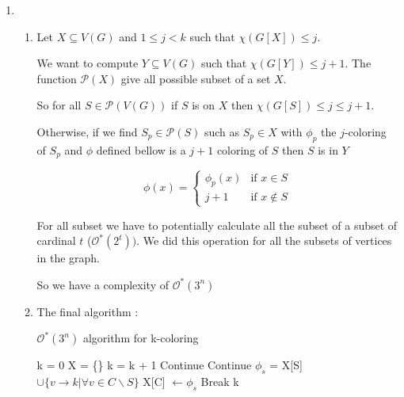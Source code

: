 \documentclass{article}
\theoremstyle{plain}
\begin{document}
\begin{enumerate}
    \newpage
    \item
      \begin{enumerate}
        \item Let $X \subseteq V(G)$ and $1 \leq j < k$ such that
          $\chi(G[X]) \leq j$.

          We want to compute $Y \subseteq V(G)$ such that
          $\chi(G[Y]) \leq j + 1$. The function $\mathcal P(X)$ give all
          possible subset of a set $X$.

          So for all $S \in \mathcal P (V(G))$
          if $S$ is on $X$ then $\chi(G[S]) \leq j \leq j + 1$.

          Otherwise, if we find $S_p \in \mathcal P(S)$ such as $S_p \in X$ with
          $\phi_p$ the $j$-coloring of $S_p$ and $\phi$ defined bellow is a
          $j+1$ coloring of $S$ then $S$ is in $Y$

          \[
            \phi(x) = \begin{cases}
              \phi_p(x) & \text{if } x \in S \\
              j + 1 & \text{if } x \not \in S
            \end{cases}
          \]

          For all subset we have to potentially calculate all the subset of a
          subset of cardinal $t$ ($\mathcal O^*(2^t))$. We did this operation
          for all the subsets of vertices in the graph.

          So we have a complexity of $\mathcal O^*(3^n)$

      \item The final algorithm :

        \begin{algorithm}
          \caption{$\mathcal O^*(3^n)$ algorithm for k-coloring}
          \begin{algorithmic}[1]
              \State k = 0
              \State X = \{\}
                \State k = k + 1
                    \State Continue
                  \EndIf
                    \State Continue
                    \EndIf
                    \State $\phi_s$ = X[S] $\cup \{v \to k| \forall v \in C
                      \backslash S\}$
                      \State X[C] $\leftarrow \phi_s$
                      \State Break
                    \EndIf
                  \EndFor
                \EndFor
              \EndWhile
              \State \Return k
            \EndFunction
          \end{algorithmic}
          \end{algorithm}


\end{enumerate}
\end{enumerate}
\end{document}
